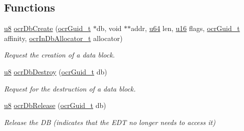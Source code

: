 \subsection*{Functions}
\begin{DoxyCompactItemize}
\item
\hyperlink{group__OCRTypesGeneral_ga92c50087ca0e64fa93fc59402c55f8ca}{u8} \hyperlink{func_ocrDbCreate}
{ocr\-Db\-Create} (\hyperlink{group__OCRTypesGeneral_gacde3883d1ce245c051133c2c3aa82fc8}{ocr\-Guid\-\_\-t} $\ast$db, void $\ast$$\ast$addr, \hyperlink{group__OCRTypesGeneral_ga3f7e2bcbb0b4c338f3c4f6c937cd4234}{u64} len, \hyperlink{group__OCRTypesGeneral_gace9d960e74685e2cd84b36132dbbf8aa}{u16} flags, \hyperlink{group__OCRTypesGeneral_gacde3883d1ce245c051133c2c3aa82fc8}{ocr\-Guid\-\_\-t} affinity, \hyperlink{group__OCRTypesDB_gabffd082fa19860aa5a9822beba6b68a5}{ocr\-In\-Db\-Allocator\-\_\-t} allocator)
\begin{DoxyCompactList}\small\item\em Request the creation of a data block. \end{DoxyCompactList}

\item
\hyperlink{group__OCRTypesGeneral_ga92c50087ca0e64fa93fc59402c55f8ca}{u8} \hyperlink{group__OCRDataBlock_gabc80ea5594e5e55a541a1df4c7727821}
{ocr\-Db\-Destroy} (\hyperlink{group__OCRTypesGeneral_gacde3883d1ce245c051133c2c3aa82fc8}{ocr\-Guid\-\_\-t} db)
\begin{DoxyCompactList}\small\item\em Request for the destruction of a data block. \end{DoxyCompactList}

\item
\hyperlink{group__OCRTypesGeneral_ga92c50087ca0e64fa93fc59402c55f8ca}{u8} \hyperlink{group__OCRDataBlock_ga2ec03c0b0998bdaf9ccc44a06fb05ca0}
{ocr\-Db\-Release} (\hyperlink{group__OCRTypesGeneral_gacde3883d1ce245c051133c2c3aa82fc8}{ocr\-Guid\-\_\-t} db)
\begin{DoxyCompactList}\small\item\em Release the D\-B (indicates that the E\-D\-T no longer needs to access it) \end{DoxyCompactList}

\end{DoxyCompactItemize}



